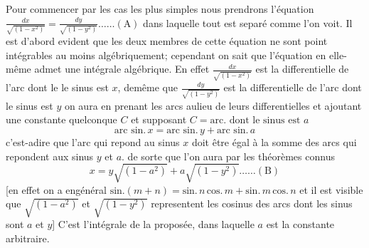 \documentclass[11pt,a4paper]{article}
\begin{document}
Pour commencer par les cas les plus simples nous prendrons
l'équation \quad $\frac{dx}{\sqrt{(1-x^{2})}} = \frac{dy}{\sqrt{(1-y^{2})}} \ldots\ldots (\text{A})$
dans laquelle tout est separé comme l'on voit. Il est d'abord
evident que les deux membres de cette équation ne sont point intégrables
au moins algébriquement; cependant on sait que l'équation en elle-même
admet une intégrale algébrique. En effet $\frac{dx}{\sqrt{(1-x^{2})}}$ est la
differentielle de l'arc dont le le sinus est $x$, demême que $\frac{dy}{\sqrt{(1-y^{2})}}$
est la differentielle de l'arc dont le sinus est $y$ on aura en
prenant les arcs aulieu de leurs differentielles et ajoutant une
constante quelconque $C$ et supposant $C = \text{arc. dont le sinus est } a$
\[ \text{arc sin.}\,x = \text{arc sin.}\,y + \text{arc sin.}\,a \]
c'est-adire que l'arc qui repond au sinus $x$ doit être égal à la
somme des arcs qui repondent aux sinus $y$ et $a$. de sorte que
l'on aura par les théorèmes connus
\[ x = y\sqrt{(1-a^{2})} + a\sqrt{(1-y^{2})} \ldots\ldots (\text{B}) \]
[en effet on a engénéral $\text{sin.}(m+n) = \text{sin.}\,n\,\text{cos.}\,m + \text{sin.}\,m\,\text{cos.}\,n$ et il est visible
que $\sqrt{(1-a^{2})}$ et $\sqrt{(1-y^{2})}$ representent les cosinus des arcs dont les sinus sont $a$ et $y$]
C'est l'intégrale de la proposée, dans laquelle $a$ est la constante
arbitraire.


\end{document}
